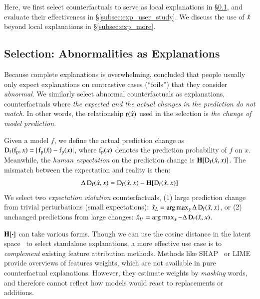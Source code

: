 %

Here, we first select counterfactuals to serve as local explanations in \S\ref{subsec:local_explain}, and evaluate their effectiveness in \S\ref{subsec:exp_user_study}.
We discuss the use of $\hat{x}$ beyond local explanations in \S\ref{subsec:exp_more}.

\subsection{Selection: Abnormalities as Explanations}
\label{subsec:local_explain}


Because complete explanations is overwhelming, \citet{miller} concluded that people usually only expect explanations on contrastive cases (``foils'') that they consider \emph{abnormal}.
We similarly select abnormal counterfactuals as explanations, \ie counterfactuals where \emph{the expected and the actual changes in the prediction do not match}.
In other words, the relationship $\operatorname*{r}(\hat{x})$ used in the selection is \emph{the change of model prediction.}

Given a model $f$, we define the actual prediction change as $\operatorname*{D_f}(\operatorname*{f_p}, x)=|\operatorname*{f_p}(\hat{x})-\operatorname*{f_p}(x)|$, where $\operatorname*{f_p}(x)$ denotes the prediction probability of $f$ on $x$.
Meanwhile, the \emph{human expectation} on the prediction change is $\operatorname*{\mathbf{H}}[\operatorname*{D_f}(\hat{x}, x)]$.
The mismatch between the expectation and reality is then:
$$\Delta\operatorname*{D_f}(\hat{x}, x) = \operatorname*{D_f}(\hat{x}, x)-\operatorname*{\mathbf{H}}[\operatorname*{D_f}(\hat{x}, x)]$$
We select two \emph{expectation violation} counterfactuals, \ie (1) large prediction change from trivial perturbations (small expectations): $\hat{x}_L = \operatorname*{arg\,max}_{\hat{x}} \Delta\operatorname*{D_f}(\hat{x}, x)$, or (2) unchanged predictions from large changes: $\hat{x}_U = \operatorname*{arg\,max}_{\hat{x}} -\Delta\operatorname*{D_f}(\hat{x}, x)$. 


$\operatorname*{\mathbf{H}}[\boldsymbol{\cdot}]$ can take various forms.
Though we can use the cosine distance in the latent space~\cite{reimers-2019-sentence-bert} to select standalone explanations, a more effective use case is to \emph{complement} existing feature attribution methods.
Methods like SHAP~\cite{NIPS2017_7062} or LIME~\cite{Ribeiro2016WhySI} provide overviews of features weights, which are not available in pure counterfactual explanations.
However, they estimate weights by \emph{masking} words, and therefore cannot reflect how models would react to replacements or additions.


